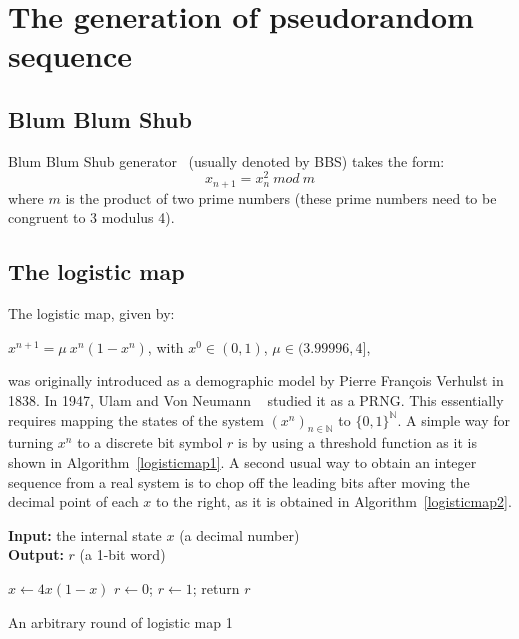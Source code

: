 \section{The generation of pseudorandom sequence}
\label{The generation of pseudorandom sequence}
\subsection{Blum Blum Shub}
Blum Blum Shub generator~\cite{BBS} (usually denoted by BBS) takes the form:
\begin{equation}
\label{BBS Eq}
x_{n+1}=x_n^2~ mod~ m  
\end{equation}
where $m$ is the product of  two prime numbers (these prime numbers  need to be congruent  to 3 modulus 4). 

\subsection{The logistic map}


The logistic map, given by:
\begin{center}
$x^{n+1}=\mu ~ x^{n}(1-x^{n})$, with $x^{0}\in(0,1)$, $\mu \in(3.99996,4]$,
\end{center}

\noindent was originally introduced as a demographic model by Pierre Fran\c cois Verhulst in 1838. In 1947, Ulam and Von Neumann ~\cite{ulam1947} studied it as a PRNG. This essentially requires mapping the states of the system $\left(x^n\right)_{n \in \mathds{N}}$ to $\{0,1\}^\mathds{N}$. A simple way for turning $x^n$ to a discrete bit symbol $r$ is by using a threshold function as it is shown in Algorithm~\ref{logisticmap1}.
A second usual way to obtain an integer sequence from a real system is to chop off the leading bits after moving the decimal point of each $x$ to the right, as it is obtained in Algorithm~\ref{logisticmap2}.

\begin{algorithm}
\textbf{Input:} the internal state $x$ (a decimal number)\\
\textbf{Output:} $r$ (a 1-bit word)
\begin{algorithmic}[1]
\STATE$x\leftarrow{4x(1-x)}$
{
\STATE$r\leftarrow0$;	
}
\ELSE
{
\STATE$r\leftarrow1$;	
}\ENDIF
\STATE return $r$\;
\medskip
\caption{An arbitrary round of logistic map 1}
\label{logisticmap1}
\end{algorithmic}
\end{algorithm}

